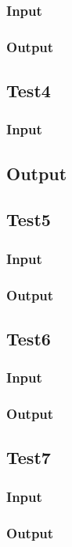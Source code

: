 \documentclass[5pt]{article}
\begin{document}
\subsubsection{Input}


\subsubsection{Output}


\subsection{Test4}
\subsubsection{Input}


\subsection{Output}


\subsection{Test5}
\subsubsection{Input}


\subsubsection{Output}

\newpage
\subsection{Test6}
\subsubsection{Input}


\subsubsection{Output}


\subsection{Test7}
\subsubsection{Input}


\subsubsection{Output}

\end{document}
